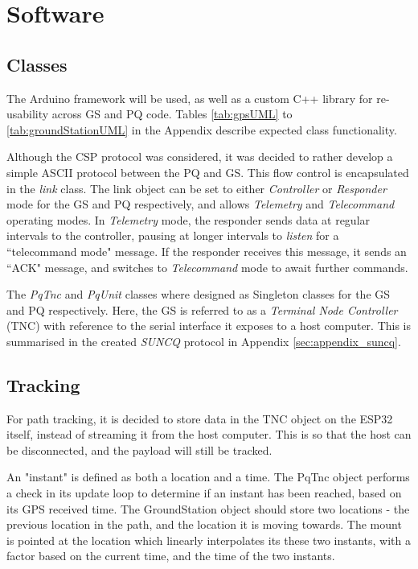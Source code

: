 \graphicspath{{./figures}}

\section{Software}

\subsection{Classes}
The Arduino framework will be used, as well as a custom C++ library for re-usability across GS and PQ code. Tables \ref{tab:gpsUML} to \ref{tab:groundStationUML} in the Appendix describe expected class functionality.

Although the CSP protocol was considered, it was decided to rather develop a simple ASCII protocol between the PQ and GS. This flow control is encapsulated in the \textit{link} class. The link object can be set to either \textit{Controller} or \textit{Responder} mode for the GS and PQ respectively, and allows \textit{Telemetry} and \textit{Telecommand} operating modes. In \textit{Telemetry} mode, the responder sends data at regular intervals to the controller, pausing at longer intervals to \textit{listen} for a ``telecommand mode" message. If the responder receives this message, it sends an ``ACK" message, and switches to \textit{Telecommand} mode to await further commands.

The \textit{PqTnc} and \textit{PqUnit} classes where designed as Singleton classes for the GS and PQ respectively. Here, the GS is referred to as a \textit{Terminal Node Controller} (TNC) with reference to the serial interface it exposes to a host computer. This is summarised in the created \textit{SUNCQ} protocol in Appendix \ref{sec:appendix_suncq}.

\subsection{Tracking}
For path tracking, it is decided to store data in the TNC object on the ESP32 itself, instead of streaming it from the host computer. This is so that the host can be disconnected, and the payload will still be tracked.

An "instant" is defined as both a location and a time. The PqTnc object performs a check in its update loop to determine if an instant has been reached, based on its GPS received time. The GroundStation object should store two locations - the previous location in the path, and the location it is moving towards. The mount is pointed at the location which linearly interpolates its these two instants, with a factor based on the current time, and the time of the two instants.

